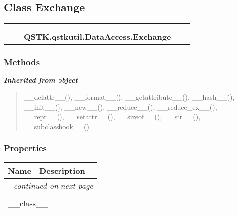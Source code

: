\subsection{Class Exchange}

    \label{QSTK:qstkutil:DataAccess:Exchange}
\begin{tabular}{cccccc}
\multicolumn{2}{r}{\settowidth{\BCL}{object}\multirow{2}{\BCL}{object}}
&&
  \\\cline{3-3}
  &&\multicolumn{1}{c|}{}
&&
  \\
&&\multicolumn{2}{l}{\textbf{QSTK.qstkutil.DataAccess.Exchange}}
\end{tabular}



  \subsubsection{Methods}


\large{\textbf{\textit{Inherited from object}}}

\begin{quote}
\_\_delattr\_\_(), \_\_format\_\_(), \_\_getattribute\_\_(), \_\_hash\_\_(), \_\_init\_\_(), \_\_new\_\_(), \_\_reduce\_\_(), \_\_reduce\_ex\_\_(), \_\_repr\_\_(), \_\_setattr\_\_(), \_\_sizeof\_\_(), \_\_str\_\_(), \_\_subclasshook\_\_()
\end{quote}


  \subsubsection{Properties}

    \vspace{-1cm}
\hspace{\varindent}\begin{longtable}{|p{\varnamewidth}|p{\vardescrwidth}|l}
\cline{1-2}
\cline{1-2} \centering \textbf{Name} & \centering \textbf{Description}& \\
\cline{1-2}
\endhead\cline{1-2}\multicolumn{3}{r}{\small\textit{continued on next page}}\\\endfoot\cline{1-2}
\endlastfoot\multicolumn{2}{|l|}{\textit{Inherited from object}}\\
\multicolumn{2}{|p{\varwidth}|}{\raggedright \_\_class\_\_}\\
\cline{1-2}
\end{longtable}


